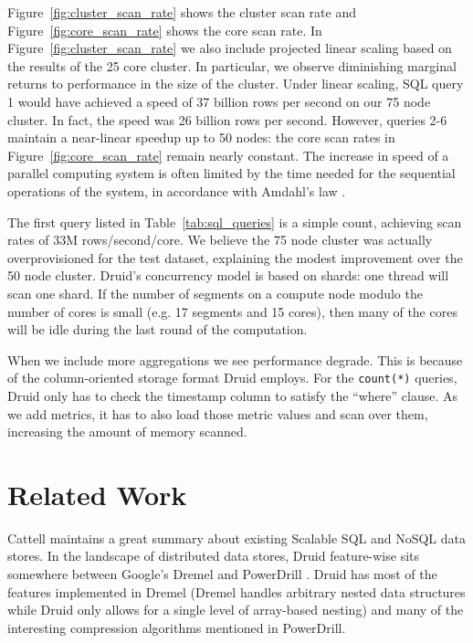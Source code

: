 \documentclass{vldb}
\begin{document}
Figure~\ref{fig:cluster_scan_rate} shows the cluster scan rate and
Figure~\ref{fig:core_scan_rate} shows the core scan rate.  In
Figure~\ref{fig:cluster_scan_rate} we also include projected linear
scaling based on the results of the 25 core cluster.  In particular,
we observe diminishing marginal returns to performance in the size of
the cluster.  Under linear scaling, SQL query 1 would have achieved a
speed of 37 billion rows per second on our 75 node cluster.  In fact,
the speed was 26 billion rows per second.  However, queries 2-6 maintain
a near-linear speedup up to 50 nodes: the core scan rates in
Figure~\ref{fig:core_scan_rate} remain nearly constant.
The increase in speed of a parallel
computing system is often limited by the time needed for the
sequential operations of the system, in accordance with Amdahl's law
\cite{amdahl1967validity}.

The first query listed in Table~\ref{tab:sql_queries} is a simple
count, achieving scan rates of 33M rows/second/core. We believe
the 75 node cluster was actually overprovisioned for the test
dataset, explaining the modest improvement over the 50 node cluster.
Druid's concurrency model is based on shards: one thread will scan one
shard. If the number of segments on a compute node modulo the number
of cores is small (e.g. 17 segments and 15 cores), then many of the
cores will be idle during the last round of the computation.

When we include more aggregations we see performance degrade.  This is
because of the column-oriented storage format Druid employs.  For the
\texttt{count(*)} queries, Druid only has to check the timestamp column to satisfy
the ``where'' clause.  As we add metrics, it has to also load those metric
values and scan over them, increasing the amount of memory scanned.

\section{Related Work}
\label{sec:related}
Cattell \cite{cattell2011scalable} maintains a great summary about existing Scalable SQL and
NoSQL data stores. In the landscape of distributed data stores, Druid
feature-wise sits somewhere between Google’s Dremel \cite{melnik2010dremel} and PowerDrill
\cite{hall2012processing}. Druid has most of the features implemented in Dremel (Dremel
handles arbitrary nested data structures while Druid only allows for a
single level of array-based nesting) and many of the interesting
compression algorithms mentioned in PowerDrill.
\end{document}
